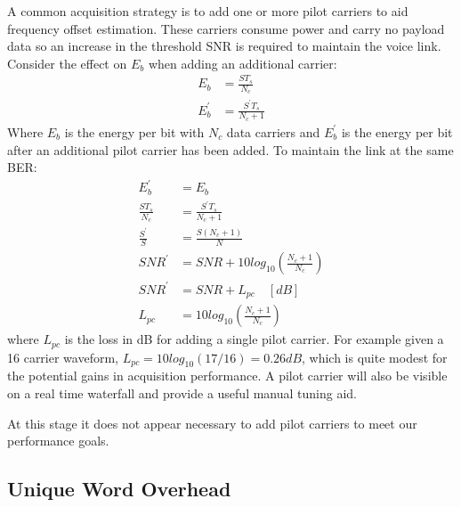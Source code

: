 \documentclass{article}
\begin{document}
A common acquisition strategy is to add one or more pilot carriers to aid frequency offset estimation. These carriers consume power and carry no payload data so an increase in the threshold SNR is required to maintain the voice link. Consider the effect on $E_b$ when adding an additional carrier:
\begin{equation}
\begin{split}
E_b &= \frac{ST_s}{N_c} \\
E^\prime_b &= \frac{S^\prime T_s}{N_c+1}
\end{split}
\end{equation}
Where $E_b$ is the energy per bit with $N_c$ data carriers and $E^\prime_b$ is the energy per bit after an additional pilot carrier has been added.  To maintain the link at the same BER:
\begin{equation}
\begin{split}
E^\prime_b &= E_b \\
\frac{S T_s}{N_c} &= \frac{S^\prime T_s} {N_c+1} \\
\frac{S^\prime}{S} &= \frac{S (N_c+1)}{N} \\
SNR^\prime &= SNR + 10log_{10}\left(\frac{N_c+1}{N_c}\right)  \\
SNR^\prime &= SNR + L_{pc}  \quad [\si{dB}] \\
L_{pc} &= 10log_{10}\left(\frac{N_c+1}{N_c}\right) 
\end{split}
\end{equation}
where $L_{pc}$ is the loss in dB for adding a single pilot carrier.  For example given a 16 carrier waveform, $L_{pc}=10log_{10}(17/16)=0.26 \si{dB}$, which is quite modest for the potential gains in acquisition performance.  A pilot carrier will also be visible on a real time waterfall and provide a useful manual tuning aid.

At this stage it does not appear necessary to add pilot carriers to meet our performance goals.

\subsection{Unique Word Overhead}
\end{document}
